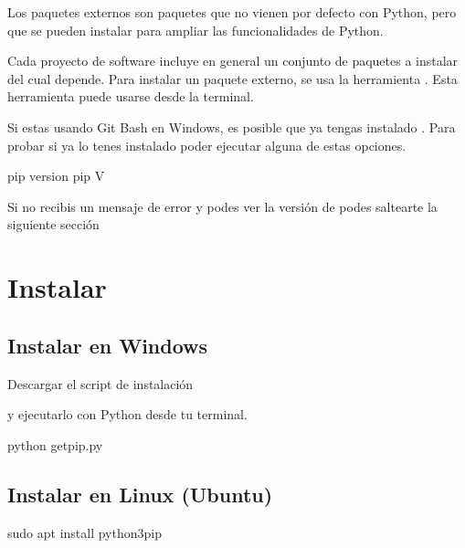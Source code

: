 \documentclass[a5paper,9pt,spanish]{sphinxmanual}
\begin{document}
\sphinxAtStartPar
Los paquetes externos son paquetes que no vienen por defecto con Python, pero que se
pueden instalar para ampliar las funcionalidades de Python.

\sphinxAtStartPar
Cada proyecto de software incluye en general un conjunto de paquetes a instalar del cual depende.
Para instalar un paquete externo, se usa la herramienta . Esta herramienta puede usarse
desde la terminal.

\sphinxAtStartPar
Si estas usando Git Bash en Windows, es posible que ya tengas instalado .
Para probar si ya lo tenes instalado poder ejecutar alguna de estas opciones.

\begin{sphinxVerbatim}[commandchars=\\\{\}]
pip \PYGZhy{}\PYGZhy{}version
pip \PYGZhy{}V
\end{sphinxVerbatim}

\sphinxAtStartPar
Si no recibis un mensaje de error y podes ver la versión de  podes saltearte la
siguiente sección


\section{Instalar }
\label{\detokenize{external-packages:instalar-pip}}

\subsection{Instalar  en Windows}
\label{\detokenize{external-packages:instalar-pip-en-windows}}
\sphinxAtStartPar
Descargar el script de instalación %
\begin{footnote}[33]\sphinxAtStartFootnote
{}
%
\end{footnote} y
ejecutarlo con Python desde tu terminal.

\begin{sphinxVerbatim}[commandchars=\\\{\}]
python get\PYGZhy{}pip.py
\end{sphinxVerbatim}


\subsection{Instalar  en Linux (Ubuntu)}
\label{\detokenize{external-packages:instalar-pip-en-linux-ubuntu}}
\begin{sphinxVerbatim}[commandchars=\\\{\}]
sudo apt install python3\PYGZhy{}pip
\end{sphinxVerbatim}
\end{document}

